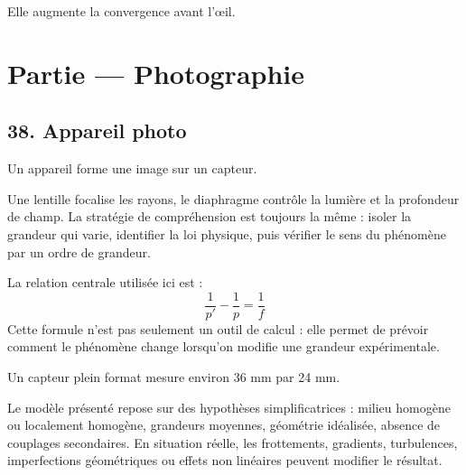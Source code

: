 \documentclass[11pt,a4paper]{article}
\begin{document}
\begin{corrigebox}[Indication]
Elle augmente la convergence avant l'œil.
\end{corrigebox}


\section{Partie — Photographie}


\subsection{38. Appareil photo}

\begin{exemplebox}
Un appareil forme une image sur un capteur.
\end{exemplebox}

\begin{methodebox}
Une lentille focalise les rayons, le diaphragme contrôle la lumière et la profondeur de champ.
La stratégie de compréhension est toujours la même : isoler la grandeur qui varie, identifier la loi physique, puis vérifier le sens du phénomène par un ordre de grandeur.
\end{methodebox}

\begin{theorembox}
La relation centrale utilisée ici est :
\[
\frac1{p'}-\frac1p=\frac1f
\]
Cette formule n'est pas seulement un outil de calcul : elle permet de prévoir comment le phénomène change lorsqu'on modifie une grandeur expérimentale.
\end{theorembox}

\begin{odgbox}
Un capteur plein format mesure environ 36 mm par 24 mm.
\end{odgbox}

\begin{attentionbox}
Le modèle présenté repose sur des hypothèses simplificatrices : milieu homogène ou localement homogène, grandeurs moyennes, géométrie idéalisée, absence de couplages secondaires. En situation réelle, les frottements, gradients, turbulences, imperfections géométriques ou effets non linéaires peuvent modifier le résultat.
\end{attentionbox}
\end{document}
